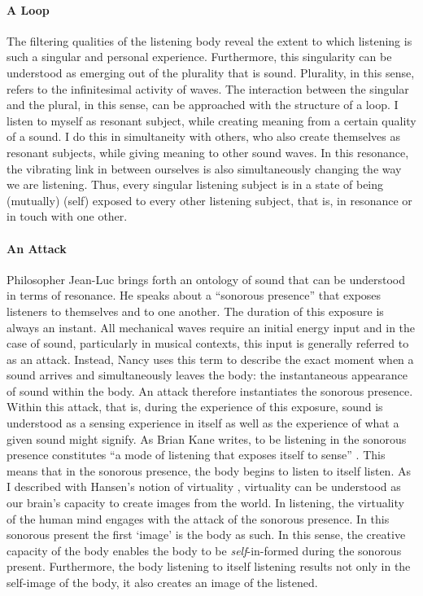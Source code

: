\paragraph{A Loop}
The filtering qualities of the listening body reveal the extent to which listening is such a singular and personal experience. Furthermore, this singularity can be understood as emerging out of the plurality that is sound. Plurality, in this sense, refers to the infinitesimal activity of waves. The interaction between the singular and the plural, in this sense, can be approached with the structure of a loop. I listen to myself as resonant subject, while creating meaning from a certain quality of a sound. I do this in simultaneity with others, who also create themselves as resonant subjects, while giving meaning to other sound waves. In this resonance, the vibrating link in between ourselves is also simultaneously changing the way we are listening. Thus, every singular listening subject is in a state of being (mutually) (self) exposed to every other listening subject, that is, in resonance or in touch with one other. 

\paragraph{An Attack}
Philosopher Jean-Luc \textcite{Nan07:Lis} brings forth an ontology of sound that can be understood in terms of resonance. He speaks about a ``sonorous presence'' \parencite[143-144]{Gra15:The} that exposes listeners to themselves and to one another. The duration of this exposure is always an instant. All mechanical waves require an initial energy input and in the case of sound, particularly in musical contexts, this input is generally referred to as an attack. Instead, Nancy uses this term to describe the exact moment when a sound arrives and simultaneously leaves the body: the instantaneous appearance of sound within the body. An attack therefore instantiates the sonorous presence. Within this attack, that is, during the experience of this exposure, sound is understood as a sensing experience in itself as well as the experience of what a given sound might signify. As Brian Kane writes, to be listening in the sonorous presence constitutes ``a mode of listening that exposes itself to sense'' \parencite[143-144]{Gra15:The}. This means that in the sonorous presence, the body begins to listen to itself listen. As I described with Hansen's notion of virtuality , virtuality can be understood as our brain's capacity to create images from the world. In listening, the virtuality of the human mind engages with the attack of the sonorous presence. In this sonorous present the first `image' is the body as such. In this sense, the creative capacity of the body enables the body to be \textit{self}-in-formed during the sonorous present. Furthermore, the body listening to itself listening results not only in the self-image of the body, it also creates an image of the listened. 

